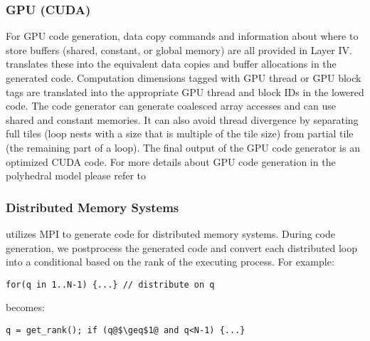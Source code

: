 \subsubsection{GPU (CUDA)}
For GPU code generation, data copy commands and information about where to store buffers (shared, constant, or global memory) are all provided in Layer IV.  \framework{} translates these into the equivalent data copies and buffer allocations in the generated code.  Computation dimensions tagged with GPU thread or GPU block tags are translated into the appropriate GPU thread and block IDs in the lowered code.  The \framework{} code generator can generate coalesced array accesses and can use shared and constant memories. It can also avoid thread divergence by separating full tiles (loop nests with a size that is multiple of the tile size) from partial tile (the remaining part of a loop).
The final output of the GPU code generator is an optimized CUDA code. For more details about GPU code generation in the polyhedral model please refer to~\cite{pencil_pact,}


\subsubsection{Distributed Memory Systems}

\framework{} utilizes MPI to generate code for distributed memory systems.  During code generation, we postprocess the generated code and convert each distributed loop into a conditional based on the rank of the executing process. For example:
\vspace{-0.15cm}
\begin{lstlisting}[numbers=none]
for(q in 1..N-1) {...} // distribute on q
\end{lstlisting}
\vspace{-0.15cm}
becomes:
\vspace{-0.15cm}
\begin{lstlisting}[escapechar=@,numbers=none]
q = get_rank(); if (q@$\geq$1@ and q<N-1) {...}
\end{lstlisting}




